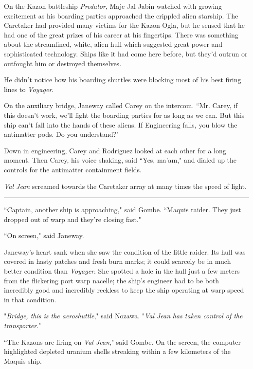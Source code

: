 \documentclass[twoside,letterpaper,12pt]{memoir}
\begin{document}
On the Kazon battleship \textit{Predator}, Maje Jal Jabin watched with growing excitement as his boarding parties approached the crippled alien starship. The Caretaker had provided many victims for the Kazon-Ogla, but he sensed that he had one of the great prizes of his career at his fingertips. There was something about the streamlined, white, alien hull which suggested great power and sophisticated technology. Ships like it had come here before, but they'd outrun or outfought him or destroyed themselves.

He didn't notice how his boarding shuttles were blocking most of his best firing lines to \textit{Voyager}.

On the auxiliary bridge, Janeway called Carey on the intercom. ``Mr. Carey, if this doesn't work, we'll fight the boarding parties for as long as we can. But this ship can't fall into the hands of these aliens. If Engineering falls, you blow the antimatter pods. Do you understand?"

Down in engineering, Carey and Rodriguez looked at each other for a long moment. Then Carey, his voice shaking, said ``Yes, ma'am," and dialed up the controls for the antimatter containment fields.

\textit{Val Jean} screamed towards the Caretaker array at many times the speed of light.

\begin{center}\rule{3cm}{0.4 pt}\end{center}

``Captain, another ship is approaching," said Gombe. ``Maquis raider. They just dropped out of warp and they're closing fast."

``On screen," said Janeway.

Janeway's heart sank when she saw the condition of the little raider. Its hull was covered in hasty patches and fresh burn marks; it could scarcely be in much better condition than \textit{Voyager}. She spotted a hole in the hull just a few meters from the flickering port warp nacelle; the ship's engineer had to be both incredibly good and incredibly reckless to keep the ship operating at warp speed in that condition.

"\textit{Bridge, this is the aeroshuttle}," said Nozawa. "\textit{Val Jean} \textit{has taken control of the transporter}."

``The Kazons are firing on \textit{Val Jean}," said Gombe. On the screen, the computer highlighted depleted uranium shells streaking within a few kilometers of the Maquis ship.
\end{document}
